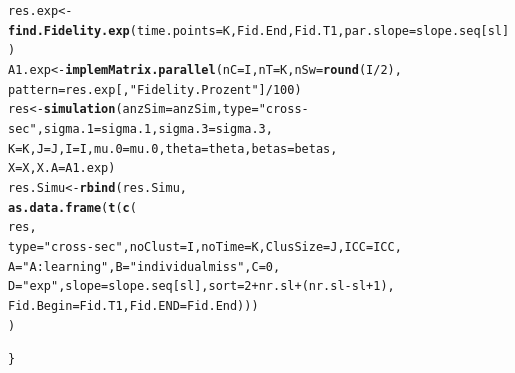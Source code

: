 \documentclass{article}\usepackage[]{graphicx}\usepackage[]{color}
\makeatletter
\newcommand{\hlnum}[1]{\textcolor[rgb]{0.686,0.059,0.569}{#1}}%
\newcommand{\hlstr}[1]{\textcolor[rgb]{0.192,0.494,0.8}{#1}}%
\newcommand{\hlopt}[1]{\textcolor[rgb]{0,0,0}{#1}}%
\newcommand{\hlstd}[1]{\textcolor[rgb]{0.345,0.345,0.345}{#1}}%
\newcommand{\hlkwb}[1]{\textcolor[rgb]{0.69,0.353,0.396}{#1}}%
\newcommand{\hlkwc}[1]{\textcolor[rgb]{0.333,0.667,0.333}{#1}}%
\newcommand{\hlkwd}[1]{\textcolor[rgb]{0.737,0.353,0.396}{\textbf{#1}}}%
\newenvironment{kframe}{%
 \def\at@end@of@kframe{}%
 \ifinner\ifhmode%
  \def\at@end@of@kframe{\end{minipage}}%
  \begin{minipage}{\columnwidth}%
 \fi\fi%
 \def\FrameCommand##1{\hskip\@totalleftmargin \hskip-\fboxsep
 \colorbox{shadecolor}{##1}\hskip-\fboxsep
     \hskip-\linewidth \hskip-\@totalleftmargin \hskip\columnwidth}%
 \MakeFramed {\advance\hsize-\width
   \@totalleftmargin\z@ \linewidth\hsize
   \@setminipage}}%
 {\par\unskip\endMakeFramed%
 \at@end@of@kframe}
\newenvironment{knitrout}{}{} %
\makeatother
\begin{document}
\begin{knitrout}
\begin{kframe}
\begin{alltt}
    \hlstd{res.exp}\hlkwb{<-}\hlkwd{find.Fidelity.exp}\hlstd{(}\hlkwc{time.points}\hlstd{=K, Fid.End, Fid.T1,} \hlkwc{par.slope}\hlstd{=slope.seq[sl])}
    \hlstd{A1.exp} \hlkwb{<-}\hlkwd{implemMatrix.parallel}\hlstd{(}\hlkwc{nC}\hlstd{=I,} \hlkwc{nT}\hlstd{=K,} \hlkwc{nSw}\hlstd{=}\hlkwd{round}\hlstd{(I}\hlopt{/}\hlnum{2}\hlstd{),}
                                    \hlkwc{pattern}\hlstd{=res.exp[,}\hlstr{"Fidelity.Prozent"}\hlstd{]}\hlopt{/}\hlnum{100}\hlstd{)}
    \hlstd{res}\hlkwb{<-}\hlkwd{simulation}\hlstd{(}\hlkwc{anzSim}\hlstd{=anzSim,}\hlkwc{type}\hlstd{=}\hlstr{"cross-sec"}\hlstd{,} \hlkwc{sigma.1}\hlstd{=sigma.1,}\hlkwc{sigma.3}\hlstd{=sigma.3,}
                       \hlkwc{K}\hlstd{=K,}\hlkwc{J}\hlstd{=J,}\hlkwc{I}\hlstd{=I,}\hlkwc{mu.0}\hlstd{=mu.0,} \hlkwc{theta}\hlstd{=theta,}\hlkwc{betas}\hlstd{=betas,}
                       \hlkwc{X}\hlstd{=X,} \hlkwc{X.A}\hlstd{=A1.exp)}
    \hlstd{res.Simu}\hlkwb{<-}\hlkwd{rbind}\hlstd{(res.Simu,}
                    \hlkwd{as.data.frame}\hlstd{(}\hlkwd{t}\hlstd{(}\hlkwd{c}\hlstd{(}
                      \hlstd{res,}
                      \hlkwc{type}\hlstd{=}\hlstr{"cross-sec"}\hlstd{,} \hlkwc{noClust}\hlstd{=I,} \hlkwc{noTime}\hlstd{=K,} \hlkwc{ClusSize}\hlstd{=J,}  \hlkwc{ICC}\hlstd{=ICC,}
                      \hlkwc{A}\hlstd{=}\hlstr{"A: learning"}\hlstd{,} \hlkwc{B}\hlstd{=}\hlstr{"individual miss"}\hlstd{,} \hlkwc{C}\hlstd{=}\hlnum{0}\hlstd{,}
                      \hlkwc{D}\hlstd{=}\hlstr{"exp"}\hlstd{,} \hlkwc{slope}\hlstd{=slope.seq[sl],} \hlkwc{sort}\hlstd{=}\hlnum{2}\hlopt{+}\hlstd{nr.sl}\hlopt{+}\hlstd{(nr.sl}\hlopt{-}\hlstd{sl}\hlopt{+}\hlnum{1}\hlstd{),}
                     \hlkwc{Fid.Begin}\hlstd{=Fid.T1,} \hlkwc{Fid.END}\hlstd{=Fid.End)))}
    \hlstd{)}

\hlstd{\}}
\end{alltt}


{\ttfamily\noindent\color{warningcolor}{\#\# Warning in optwrap(optimizer, devfun, x@theta, lower = x@lower, calc.derivs = TRUE, : convergence code 3 from bobyqa: bobyqa -- a trust region step failed to reduce q}}

{\ttfamily\noindent\color{warningcolor}{\#\# Warning in optwrap(optimizer, devfun, x@theta, lower = x@lower, calc.derivs = TRUE, : convergence code 3 from bobyqa: bobyqa -- a trust region step failed to reduce q}}


\end{kframe}
\end{knitrout}
\end{document}
